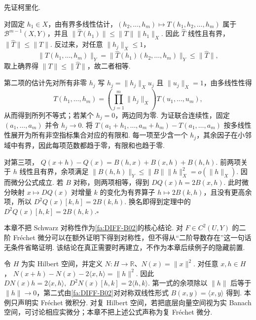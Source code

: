 \begin{FAProof}
先证柯里化.\par\noindent 对固定 \(\displaystyle h_1\in X\)，由有界多线性估计，\(\displaystyle(h_2,\dots,h_m)\mapsto T(h_1,h_2,\dots,h_m)\) 属于 \(\displaystyle\mathcal B^{m-1}(X,Y)\)，并且
\(\displaystyle \|\widehat T(h_1)\| \leqslant \|T\|\|h_1\|_X.\)
因此 \(\displaystyle\widehat T\) 线性且有界，\(\displaystyle\|\widehat T\|\leqslant\|T\|\). 反过来，对任意 \(\displaystyle\|h_j\|_X\leqslant1\)，
\[
\|T(h_1,\dots,h_m)\|_Y
=
\|\widehat T(h_1)(h_2,\dots,h_m)\|_Y
\leqslant
\|\widehat T\|,
\]
取上确界得 \(\displaystyle\|T\|\leqslant\|\widehat T\|\)，故二者相等.

第二项的估计先对所有非零 \(\displaystyle h_j\) 写 \(\displaystyle h_j=\|h_j\|_Xu_j\) 且 \(\displaystyle\|u_j\|_X=1\)，由多线性性得
\[
T(h_1,\dots,h_m)
=
\left(\prod_{j=1}^m\|h_j\|_X\right)T(u_1,\dots,u_m),
\]
从而得到所列不等式；若某个 \(\displaystyle h_j=0\)，两边同为零. 为证联合连续性，固定 \(\displaystyle(a_1,\dots,a_m)\) 并令 \(\displaystyle h_j\to0\). 将
\(\displaystyle T(a_1+h_1,\dots,a_m+h_m)-T(a_1,\dots,a_m)\)
按多线性性展开为所有非空指标集合对应的有限和. 每一项至少含一个 \(\displaystyle h_j\)，其余因子在小邻域中有界，因此每项范数都趋于零，有限和也趋于零.

对第三项，
\(\displaystyle Q(x+h)-Q(x) = B(h,x)+B(x,h)+B(h,h).\)
前两项关于 \(\displaystyle h\) 线性且有界，余项满足 \(\displaystyle\|B(h,h)\|_Y\leqslant\|B\|\|h\|_X^2=o(\|h\|_X)\). 因而微分公式成立. 若 \(\displaystyle B\) 对称，则两项相等，得到 \(\displaystyle DQ(x)h=2B(x,h)\). 此时微分映射 \(\displaystyle x\mapsto DQ(x)\) 对增量 \(\displaystyle k\) 的变化为有界算子 \(\displaystyle h\mapsto2B(k,h)\)，且没有更高余项，所以
\(\displaystyle D^2Q(x)[k,h]=2B(k,h).\)
换名即得到定理中的 \(\displaystyle D^2Q(x)[h,k]=2B(h,k)\).\hfill\(\square\)
\end{FAProof}

\begin{FARemark}[二阶微分的对称性边界]
本章不把 Schwarz 对称性作为\autoref{fa:DIFF-B02}的核心结论. 对 \(\displaystyle F\in C^2(U,Y)\) 的二阶 Fréchet 微分可以在额外证明下得到对称性，但不得从“二阶导数存在”这一句话无条件省略证明. 该结论在真正需要时再建立，不作为本章后续例子的隐藏前置.
\end{FARemark}

\begin{FAExample}\label{iii01:norm-square}
令 \(\displaystyle H\) 为实 Hilbert 空间，并定义 \(\displaystyle N:H\to\mathbb R\)、\(\displaystyle N(x)=\|x\|^2\). 对任意 \(\displaystyle x,h\in H\)，
\(\displaystyle N(x+h)-N(x)-2\langle x,h\rangle = \|h\|^2.\)
因此
\(\displaystyle DN(x)h=2\langle x,h\rangle, \; D^2N(x)[h,k]=2\langle h,k\rangle.\)
第一式的余项除以 \(\displaystyle\|h\|\) 后等于 \(\displaystyle\|h\|\to0\)，第二式由\autoref{fa:DIFF-B02}对对称双线性形式 \(\displaystyle B(x,y)=\langle x,y\rangle\) 得到. 本例只声明实 Fréchet 微积分. 对复 Hilbert 空间，若把底层向量空间视为实 Banach 空间，可讨论相应实微分；本章不把上述公式声称为复 Fréchet 微分.
\end{FAExample}

